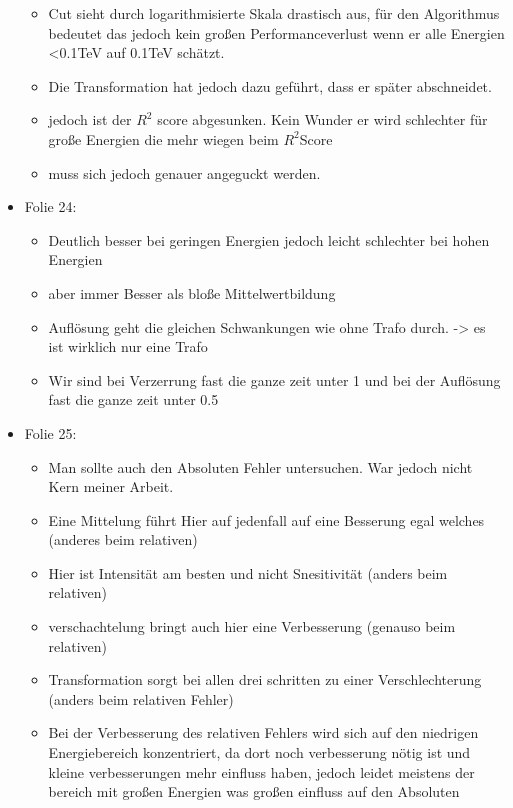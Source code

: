 \documentclass[
  bibliography=totoc,     %
  captions=tableheading,  %
  titlepage=firstiscover, %
]{scrartcl}
\begin{document}
\begin{itemize}
\begin{itemize}
        \item Cut sieht durch logarithmisierte Skala drastisch aus, für den Algorithmus bedeutet das jedoch kein großen Performanceverlust wenn er alle
              Energien <0.1TeV auf 0.1TeV schätzt.
        \item Die Transformation hat jedoch dazu geführt, dass er später abschneidet.
        \item jedoch ist der $R^2$ score abgesunken. Kein Wunder er wird schlechter für große Energien die mehr wiegen beim $R^2$Score
        \item muss sich jedoch genauer angeguckt werden.
      \end{itemize}
    \item Folie 24:
      \begin{itemize}
        \item Deutlich besser bei geringen Energien jedoch leicht schlechter bei hohen Energien
        \item aber immer Besser als bloße Mittelwertbildung
        \item Auflösung geht die gleichen Schwankungen wie ohne Trafo durch. -> es ist wirklich nur eine Trafo
        \item Wir sind bei Verzerrung fast die ganze zeit unter 1 und bei der Auflösung fast die ganze zeit unter 0.5
      \end{itemize}
    \item Folie 25:
      \begin{itemize}
        \item Man sollte auch den Absoluten Fehler untersuchen. War jedoch nicht Kern meiner Arbeit.
        \item Eine Mittelung führt Hier auf jedenfall auf eine Besserung egal welches (anderes beim relativen)
        \item Hier ist Intensität am besten und nicht Snesitivität (anders beim relativen)
        \item verschachtelung bringt auch hier eine Verbesserung (genauso beim relativen)
        \item Transformation sorgt bei allen drei schritten zu einer Verschlechterung (anders beim relativen Fehler)
        \item Bei der Verbesserung des relativen Fehlers wird sich auf den niedrigen Energiebereich konzentriert, da dort noch verbesserung nötig ist
              und kleine verbesserungen mehr einfluss haben, jedoch leidet meistens der bereich mit großen Energien was großen einfluss auf den Absoluten

\end{itemize}
\end{itemize}
\end{document}
